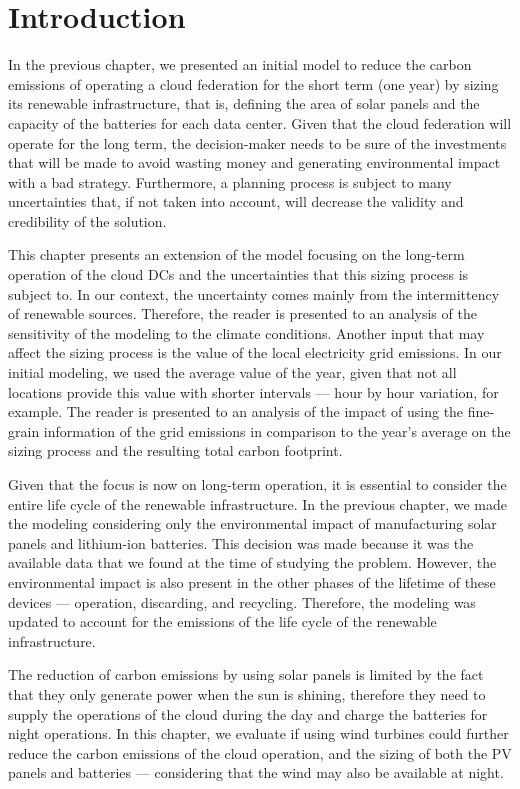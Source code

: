 \section{Introduction}

In the previous chapter, we presented an initial model to reduce the carbon emissions of operating a cloud federation for the short term (one year) by sizing its renewable infrastructure, that is, defining the area of solar panels and the capacity of the batteries for each data center. Given that the cloud federation will operate for the long term, the decision-maker needs to be sure of the investments that will be made to avoid wasting money and generating environmental impact with a bad strategy. Furthermore, a planning process is subject to many uncertainties that, if not taken into account, will decrease the validity and credibility of the solution.

This chapter presents an extension of the model focusing on the long-term operation of the cloud DCs and the uncertainties that this sizing process is subject to. In our context, the uncertainty comes mainly from the intermittency of renewable sources. Therefore, the reader is presented to an analysis of the sensitivity of the modeling to the climate conditions. Another input that may affect the sizing process is the value of the local electricity grid emissions. In our initial modeling, we used the average value of the year, given that not all locations provide this value with shorter intervals --- hour by hour variation, for example. The reader is presented to an analysis of the impact of using the fine-grain information of the grid emissions in comparison to the year's average on the sizing process and the resulting total carbon footprint.

Given that the focus is now on long-term operation, it is essential to consider the entire life cycle of the renewable infrastructure. In the previous chapter, we made the modeling considering only the environmental impact of manufacturing solar panels and lithium-ion batteries. This decision was made because it was the available data that we found at the time of studying the problem. However, the environmental impact is also present in the other phases of the lifetime of these devices --- operation, discarding, and recycling. Therefore, the modeling was updated to account for the emissions of the life cycle of the renewable infrastructure. 

The reduction of carbon emissions by using solar panels is limited by the fact that they only generate power when the sun is shining, therefore they need to supply the operations of the cloud during the day and charge the batteries for night operations. In this chapter, we evaluate if using wind turbines could further reduce the carbon emissions of the cloud operation, and the sizing of both the PV panels and batteries --- considering that the wind may also be available at night.

